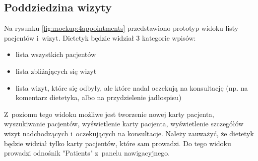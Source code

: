 







\subsection{Poddziedzina wizyty}

Na rysunku \ref{fig:mockup:4appointments} przedstawiono prototyp widoku listy pacjentów i~wizyt.
Dietetyk będzie widział 3 kategorie wpisów:
\begin{itemize}
    \item lista wszystkich pacjentów
    \item lista zbliżających się wizyt
    \item lista wizyt, które się odbyły, ale które nadal oczekują na konsultację (np. na komentarz dietetyka, albo na przydzielenie jadłospisu)
\end{itemize}
Z~poziomu tego widoku możliwe jest tworzenie nowej karty pacjenta, wyszukiwanie pacjentów, wyświetlenie karty pacjenta, wyświetlenie szczegółów wizyt nadchodzących i~oczekujących na konsultacje.
Należy zauważyć, że dietetyk będzie widział tylko karty pacjentów, które sam prowadzi.
Do tego widoku prowadzi odnośnik "Patients" z~panelu nawigacyjnego.

